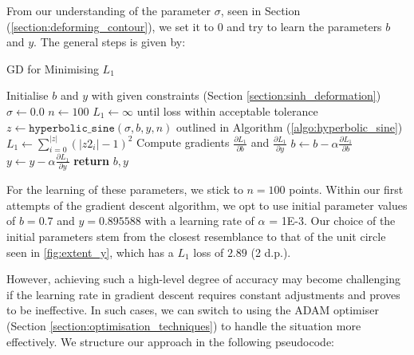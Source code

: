 \documentclass[a4paper]{report}
\begin{document}
From our understanding of the parameter $\sigma$, seen in Section (\ref{section:deforming_contour}), we set it to 0 and try to learn the parameters $b$ and $y$. The general steps is given by:

\begin{algorithm}[H]
\caption{GD for Minimising \( L_1 \)}
\label{algo:gd_l1}
\begin{algorithmic}[1]
    \State Initialise $b$ and $y$ \Comment with given constraints (Section \ref{section:sinh_deformation})
    \State $\sigma \gets 0.0$
    \State $n \gets 100$
    \State $L_1 \gets \infty$
     \Comment until loss within acceptable tolerance 
        \State $z \gets \texttt{hyperbolic\_sine}(\sigma, b, y, n)$ \Comment outlined in Algorithm (\ref{algo:hyperbolic_sine})
        \State $L_1 \gets \sum_{i=0}^{|z|} (|z2_i| - 1)^2$
        \State Compute gradients $\frac{\partial L_1}{\partial b}$ and $\frac{\partial L_1}{\partial y}$
        \State $b \gets b - \alpha \frac{\partial L_1}{\partial b}$
        \State $y \gets y - \alpha \frac{\partial L_1}{\partial y}$
    \EndWhile
    \State \textbf{return} $b, y$
\EndProcedure
\end{algorithmic}
\end{algorithm}

For the learning of these parameters, we stick to $n = 100$ points. Within our first attempts of the gradient descent algorithm, we opt to use initial parameter values of $b = 0.7$ and $y = 0.895588$ with a learning rate of $\alpha$ = 1E-3. Our choice of the initial parameters stem from the closest resemblance to that of the unit circle seen in \autoref{fig:extent_y}, which has a $L_1$ loss of $2.89$ (2 d.p.).
 
 However, achieving such a high-level degree of accuracy may become challenging if the learning rate in gradient descent requires constant adjustments and proves to be ineffective. In such cases, we can switch to using the ADAM optimiser (Section \ref{section:optimisation_techniques}) to handle the situation more effectively. We structure our approach in the following pseudocode:
 
\end{document}
